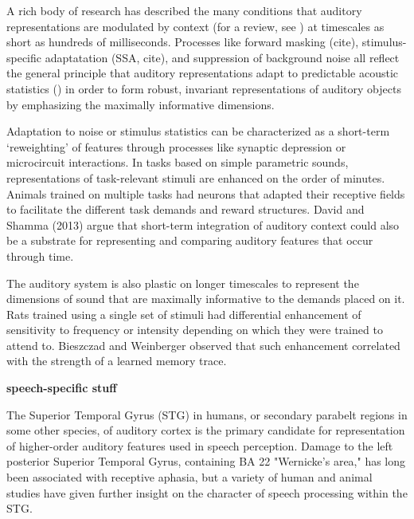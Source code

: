 A rich body of research has described the many conditions that auditory representations are modulated by context (for a review, see \citep{angeloniContextualModulationSound2018}) at timescales as short as hundreds of milliseconds\citep{deanRapidNeuralAdaptation2008b,rabinowitzContrastGainControl2011c}. Processes like forward masking (cite), stimulus-specific adaptatation (SSA, cite), and suppression of background noise all reflect the general principle that auditory representations adapt to predictable acoustic statistics () in order to form robust, invariant representations of auditory objects\citep{rabinowitzConstructingNoiseinvariantRepresentations2013} by emphasizing the maximally informative dimensions\citep{atencioMultidimensionalReceptiveField2017}. 

Adaptation to noise or stimulus statistics can be characterized as a short-term `reweighting' of features through processes like synaptic depression\citep{mesgaraniMechanismsNoiseRobust2014,davidRapidSynapticDepression2009} or microcircuit interactions\citep{natanComplementaryControlSensory2015b,natanCorticalInterneuronsDifferentially2017}. In tasks based on simple parametric sounds, representations of task-relevant stimuli are enhanced on the order of minutes\citep{fritzRapidTaskrelatedPlasticity2003a}. Animals trained on multiple tasks had neurons that adapted their receptive fields to facilitate the different task demands\citep{fritzActiveListeningTaskdependent2005b} and reward structures\citep{davidTaskRewardStructure2012}. David and Shamma (2013\citep{davidIntegrationMultipleTimescales2013}) argue that short-term integration of auditory context could also be a substrate for representing and comparing auditory features that occur through time. 

The auditory system is also plastic on longer timescales to represent the dimensions of sound that are maximally informative to the demands placed on it. Rats trained using a single set of stimuli had differential enhancement of sensitivity to frequency or intensity depending on which they were trained to attend to\citep{Polley2006}. Bieszczad and Weinberger observed that such enhancement correlated with the strength of a learned memory trace\citep{bieszczadRepresentationalGainCortical2010}. 

\textbf{speech-specific stuff}

The Superior Temporal Gyrus (STG) in humans, or secondary parabelt regions in some other species, of auditory cortex is the primary candidate for representation of higher-order auditory features used in speech perception. Damage to the left posterior Superior Temporal Gyrus, containing BA 22 "Wernicke's area," has long been associated with receptive aphasia, but a variety of human and animal studies have given further insight on the character of speech processing within the STG.

